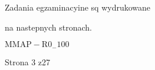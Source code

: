 \documentclass[a4paper,12pt]{article}
\begin{document}
Zadania egzaminacyine sq wydrukowane

na nastepnych stronach.

$\mathrm{M}\mathrm{M}\mathrm{A}\mathrm{P}-\mathrm{R}0_{-}100$

Strona 3 z27
\end{document}
